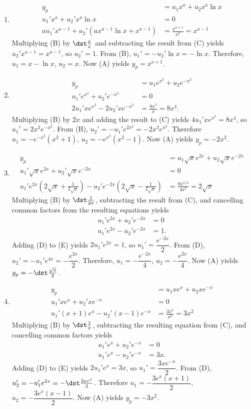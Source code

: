 \documentclass[openany]{book}
\newenvironment{sectionSolutions}{
 \begin{enumerate}[item-label={\thesection.\arabic{enumi}.}]
}{
 \end{enumerate}
}
\begin{document}
\begin{sectionSolutions}
\item
\begin{align*}
y_p&=u_1x^a+u_2x^a\ln x\tag{A}\\
u_1'x^a+u_2'x^a\ln x&=0\tag{B}\\
au_1'x^{a-1}+u_2'(ax^{a-1}\ln x+x^{a-1})&=\frac{x^{a+1}}{
x^2}=x^{a-1}\tag{C}
\end{align*}
Multiplying (B) by $\dst\frac{a}{ x}$ and subtracting
the result from (C) yields $u_2'x^{a-1}=x^{a-1}$, so
$u_2'=1$. From (B), $u_1'=-u_2'\ln x=-\ln x$.
Therefore, $u_1=x-\ln x$, $u_2=x$. Now (A) yields $y_p=x^{a+1}$.


\item
\begin{align*}
y_p&=u_1e^{x^2}+u_2e^{-x^2}\tag{A}\\
u_1'e^{x^2} +u_2'e^{-x^2}&=0\tag{B}\\
2u_1'xe^{x^2}-2u_2'xe^{-x^2}&=\frac{8x^5}{x}=8x^4. \tag{C}
\end{align*}
Multiplying (B) by $2x$ and adding the result to
(C) yields $4u_1'xe^{x^2}=8x^4$, so
$u_1'=2x^3e^{-x^2}$. From (B),
$u_2'=-u_1'e^{2x^2}=-2x^3e^{x^2}$. Therefore $u_1=-e^{-x^2}(x^2+1)$,
$u_2=-e^{x^2}(x^2-1)$. Now (A) yields $y_p=-2x^2$.


\item
\begin{align*}
y_p&=u_1\sqrt xe^{2x}+u_2\sqrt xe^{-2x}\tag{A}\\
u_1'\sqrt xe^{2x}+u_2'\sqrt xe^{-2x}&=0\tag{B}\\
u_1'e^{2x}\left(2\sqrt x+\frac{1}{2\sqrt x}\right)-u_2'e^{-2x}
\left(2\sqrt x-\frac{1}{2\sqrt x}\right)&=\frac{8x^{5/2}}{4x^2}
=2\sqrt x\tag{C}
\end{align*}
Multiplying (B) by $\dst\frac{1}{2x}$, subtracting the
result from (C), and cancelling common factors from
the resulting equations yields
\begin{align*}
u_1'e^{2x}+u_2'e^{-2x}&=0\tag{D}\\
u_1'e^{2x}-u_2'e^{-2x}&=1.\tag{E}
\end{align*}
Adding (D) to (E) yields
$2u_1'e^{2x}=1$, so $u_1'=\dfrac{e^{-2x}}{2}$. From
(D), $u_2'=-u_1'e^{4x}=-\dfrac{e^{2x}}{2}$.
Therefore, $u_1=-\dfrac{e^{-2x}}{4}$, $u_2=-\dfrac{e^{2x}}{4}$. Now
(A) yields $y_p=-\dst\frac{\sqrt x}{2}$.


\item
\begin{align*}
y_p&=u_1xe^x+u_2xe^{-x}\tag{A}\\
u_1'xe^x+u_2'xe^{-x}&=0\tag{B}\\
u_1'(x+1)e^x-u_2'(x-1)e^{-x}&=\frac{3x^4}{ x^2}=3x^2\tag{C}
\end{align*}
Multiplying (B) by $\dst\frac{1}{ x}$, subtracting the
resulting equation from (C), and cancelling common
factors yields
\begin{align*}
u_1'e^x+u_2'e^{-x}&=0\tag{D}\\
u_1'e^x-u_2'e^{-x}&=3x.\tag{E}
\end{align*}
Adding (D) to (E) yields
$2u_1'e^x=3x$, so $u_1'=\dfrac{3xe^{-x}}{2}$. From
(D), $u_2'=-u_1'e^{2x}=-\dst\frac{3xe^x}{2}$.
Therefore $u_1=-\dfrac{3e^x(x+1)}{2}$, $u_2=-\dfrac{3e^x(x-1)}{2}$.
Now (A) yields $y_p=-3x^2$.



\end{sectionSolutions}
\end{document}
